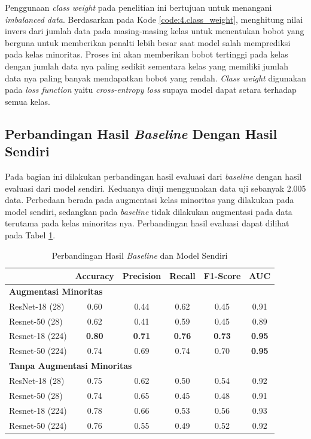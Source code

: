 Penggunaan \textit{class weight} pada penelitian ini bertujuan untuk 
menangani \textit{imbalanced data}. Berdasarkan pada Kode \ref{code:4.class_weight}, 
menghitung nilai invers dari jumlah data pada masing-masing kelas untuk 
menentukan bobot yang berguna untuk memberikan penalti lebih besar saat 
model salah memprediksi pada kelas minoritas. Proses ini akan memberikan 
bobot tertinggi pada kelas dengan jumlah data nya paling sedikit sementara 
kelas yang memiliki jumlah data nya paling banyak mendapatkan bobot yang 
rendah. \textit{Class weight} digunakan pada \textit{loss function} yaitu \textit{cross-entropy loss} 
supaya model dapat setara terhadap semua kelas. 


\subsection{Perbandingan Hasil \textit{Baseline} Dengan Hasil Sendiri} \label{IV.Perbandingan_Hasil_Baseline}
Pada bagian ini dilakukan perbandingan hasil evaluasi dari \textit{baseline} 
dengan hasil evaluasi dari model sendiri. Keduanya diuji menggunakan 
data uji sebanyak 2.005 data. Perbedaan berada pada augmentasi kelas 
minoritas yang dilakukan pada model sendiri, sedangkan pada 
\textit{baseline} tidak dilakukan augmentasi pada data terutama pada 
kelas minoritas nya. Perbandingan hasil evaluasi dapat dilihat pada Tabel 
\ref{tab:perbandingan_hasil_evaluasi}. \par

\begin{table}[!htbp]
\centering
\caption{Perbandingan Hasil \textit{Baseline} dan Model Sendiri}
\label{tab:perbandingan_hasil_evaluasi}

\begin{tabular}{lccccc}
    \toprule
    & \textbf{Accuracy} & \textbf{Precision} & \textbf{Recall} & \textbf{F1-Score} & \textbf{AUC} \\
    \midrule

    \multicolumn{6}{l}{\textbf{Augmentasi Minoritas}} \\
    \midrule
    ResNet-18 (28) & 0.60 & 0.44 & 0.62 & 0.45 & 0.91 \\
    Resnet-50 (28) & 0.62 & 0.41 & 0.59 & 0.45 & 0.89 \\
    Resnet-18 (224) & \textbf{0.80} & \textbf{0.71} & \textbf{0.76} & \textbf{0.73} & \textbf{0.95} \\
    Resnet-50 (224) & 0.74 & 0.69 & 0.74 & 0.70 & \textbf{0.95} \\

    \midrule
    \multicolumn{6}{l}{\textbf{Tanpa Augmentasi Minoritas}} \\
    \midrule
    ResNet-18 (28) & 0.75 & 0.62 & 0.50 & 0.54 & 0.92 \\
    Resnet-50 (28) & 0.74 & 0.65 & 0.45 & 0.48 & 0.91 \\
    Resnet-18 (224) & 0.78 & 0.66 & 0.53 & 0.56 & 0.93 \\
    Resnet-50 (224) & 0.76 & 0.55 & 0.49 & 0.52 & 0.92 \\

    \bottomrule
    \end{tabular}
\end{table}


